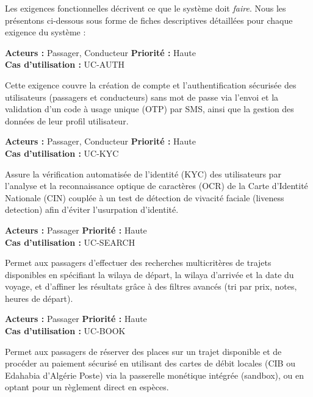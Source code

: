 Les exigences fonctionnelles décrivent ce que le système doit \textit{faire}. Nous les présentons ci-dessous sous forme de fiches descriptives détaillées pour chaque exigence du système :

\begin{funcreq}[title={\textbf{EF~1.1 — Inscription, authentification OTP et gestion profil}}]
\textbf{Acteurs :} Passager, Conducteur \hfill \textbf{Priorité :} Haute \\
\textbf{Cas d'utilisation :} UC-AUTH
\smallskip

Cette exigence couvre la création de compte et l'authentification sécurisée des utilisateurs (passagers et conducteurs) sans mot de passe via l'envoi et la validation d'un code à usage unique (OTP) par SMS, ainsi que la gestion des données de leur profil utilisateur.
\end{funcreq}

\begin{funcreq}[title={\textbf{EF~1.2 — Vérification d'identité biométrique (OCR + liveness)}}]
\textbf{Acteurs :} Passager, Conducteur \hfill \textbf{Priorité :} Haute \\
\textbf{Cas d'utilisation :} UC-KYC
\smallskip

Assure la vérification automatisée de l'identité (KYC) des utilisateurs par l'analyse et la reconnaissance optique de caractères (OCR) de la Carte d'Identité Nationale (CIN) couplée à un test de détection de vivacité faciale (liveness detection) afin d'éviter l'usurpation d'identité.
\end{funcreq}

\begin{funcreq}[title={\textbf{EF~1.3 — Recherche de trajets avec filtres}}]
\textbf{Acteurs :} Passager \hfill \textbf{Priorité :} Haute \\
\textbf{Cas d'utilisation :} UC-SEARCH
\smallskip

Permet aux passagers d'effectuer des recherches multicritères de trajets disponibles en spécifiant la wilaya de départ, la wilaya d'arrivée et la date du voyage, et d'affiner les résultats grâce à des filtres avancés (tri par prix, notes, heures de départ).
\end{funcreq}

\begin{funcreq}[title={\textbf{EF~1.4 — Réservation et paiement (CIB/Edahabia/espèces)}}]
\textbf{Acteurs :} Passager \hfill \textbf{Priorité :} Haute \\
\textbf{Cas d'utilisation :} UC-BOOK
\smallskip

Permet aux passagers de réserver des places sur un trajet disponible et de procéder au paiement sécurisé en utilisant des cartes de débit locales (CIB ou Edahabia d'Algérie Poste) via la passerelle monétique intégrée (sandbox), ou en optant pour un règlement direct en espèces.
\end{funcreq}

